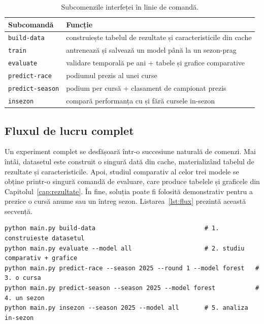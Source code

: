 \documentclass[12pt,a4paper]{report}
\begin{document}
\begin{table}[htbp]
  \centering
  \begin{tabular}{l l}
    \toprule
    \textbf{Subcomandă} & \textbf{Funcție} \\
    \midrule
    \texttt{build-data}     & construiește tabelul de rezultate și caracteristicile din cache \\
    \texttt{train}          & antrenează și salvează un model până la un sezon-prag \\
    \texttt{evaluate}       & validare temporală pe ani + tabele și grafice comparative \\
    \texttt{predict-race}   & podiumul prezis al unei curse \\
    \texttt{predict-season} & podium per cursă + clasament de campionat prezis \\
    \texttt{insezon}        & compară performanța cu și fără cursele in-sezon \\
    \bottomrule
  \end{tabular}
  \caption{Subcomenzile interfeței în linie de comandă.}
  \label{tab:cli}
\end{table}

\subsection{Fluxul de lucru complet}

Un experiment complet se desfășoară într-o succesiune naturală de comenzi. Mai întâi, datasetul
este construit o singură dată din cache, materializând tabelul de rezultate și caracteristicile.
Apoi, studiul comparativ al celor trei modele se obține printr-o singură comandă de evaluare, care
produce tabelele și graficele din Capitolul~\ref{cap:rezultate}. În fine, soluția poate fi folosită
demonstrativ pentru a prezice o cursă anume sau un întreg sezon. Listarea~\ref{lst:flux} prezintă
această secvență.

\begin{lstlisting}[caption={Fluxul de lucru complet, exprimat prin comenzile interfetei.}, label={lst:flux}]
python main.py build-data                              # 1. construieste datasetul
python main.py evaluate --model all                    # 2. studiu comparativ + grafice
python main.py predict-race --season 2025 --round 1 --model forest   # 3. o cursa
python main.py predict-season --season 2025 --model forest           # 4. un sezon
python main.py insezon --season 2025 --model all       # 5. analiza in-sezon
\end{lstlisting}
\end{document}
